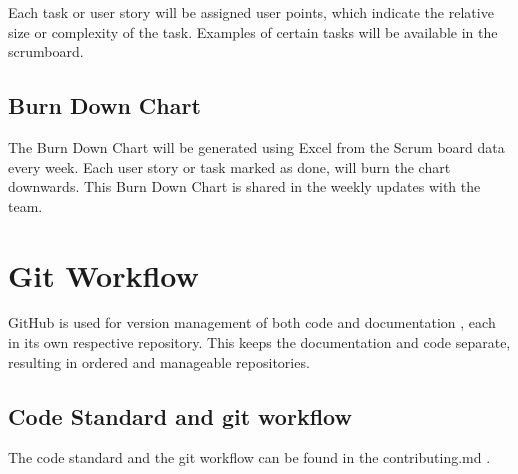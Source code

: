 \documentclass{projdoc}
\begin{document}
Each task or user story will be assigned user points, which indicate the relative size or complexity of the task. Examples of certain tasks will be available in the scrumboard.

\subsection{Burn Down Chart}

The Burn Down Chart will be generated using Excel from the Scrum board data every
week. Each user story or task marked as done, will burn the chart downwards. This
Burn Down Chart is shared in the weekly updates with the team.

\section{Git Workflow}

GitHub is used for version management of both code \autocite{crepe:code-repo} and
documentation \autocite{crepe:docs-repo}, each in its own respective repository. This
keeps the documentation and code separate, resulting in ordered and manageable
repositories.

\subsection{Code Standard and git workflow}

The code standard and the git workflow can be found in the contributing.md \autocite{crepe:code-standard}.
\end{document}
